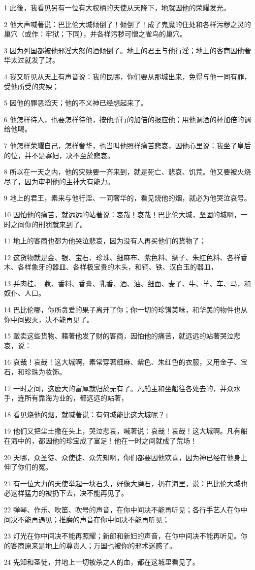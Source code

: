 \par 1 此後，我看见另有一位有大权柄的天使从天降下，地就因他的荣耀发光。
\par 2 他大声喊著说：巴比伦大城倾倒了！倾倒了！成了鬼魔的住处和各样污秽之灵的巢穴（或作：牢狱；下同），并各样污秽可憎之雀鸟的巢穴。
\par 3 因为列国都被他邪淫大怒的酒倾倒了。地上的君王与他行淫；地上的客商因他奢华太过就发了财。
\par 4 我又听见从天上有声音说：我的民哪，你们要从那城出来，免得与他一同有罪，受他所受的灾殃；
\par 5 因他的罪恶滔天；他的不义神已经想起来了。
\par 6 他怎样待人，也要怎样待他，按他所行的加倍的报应他；用他调酒的杯加倍的调给他喝。
\par 7 他怎样荣耀自己，怎样奢华，也当叫他照样痛苦悲哀，因他心里说：我坐了皇后的位，并不是寡妇，决不至於悲哀。
\par 8 所以在一天之内，他的灾殃要一齐来到，就是死亡、悲哀、饥荒。他又要被火烧尽了，因为审判他的主神大有能力。
\par 9 地上的君王，素来与他行淫、一同奢华的，看见烧他的烟，就必为他哭泣哀号。
\par 10 因怕他的痛苦，就远远的站著说：哀哉！哀哉！巴比伦大城，坚固的城啊，一时之间你的刑罚就来到了。
\par 11 地上的客商也都为他哭泣悲哀，因为没有人再买他们的货物了；
\par 12 这货物就是金、银、宝石、珍珠、细麻布、紫色料、绸子、朱红色料、各样香木、各样象牙的器皿、各样极宝贵的木头，和铜、铁、汉白玉的器皿，
\par 13 并肉桂、　蔻、香料、香膏、乳香、酒、油、细面、麦子、牛、羊、车、马，和奴仆、人口。
\par 14 巴比伦哪，你所贪爱的果子离开了你；你一切的珍馐美味，和华美的物件也从你中间毁灭，决不能再见了。
\par 15 贩卖这些货物、藉著他发了财的客商，因怕他的痛苦，就远远的站著哭泣悲哀，说：
\par 16 哀哉！哀哉！这大城啊，素常穿著细麻、紫色、朱红色的衣服，又用金子、宝石，和珍珠为妆饰。
\par 17 一时之间，这麽大的富厚就归於无有了。凡船主和坐船往各处去的，并众水手，连所有靠海为业的，都远远的站著，
\par 18 看见烧他的烟，就喊著说：有何城能比这大城呢？」
\par 19 他们又把尘土撒在头上，哭泣悲哀，喊著说：哀哉！哀哉！这大城啊。凡有船在海中的，都因他的珍宝成了富足！他在一时之间就成了荒场！
\par 20 天哪，众圣徒、众使徒、众先知啊，你们都要因他欢喜，因为神已经在他身上伸了你们的冤。
\par 21 有一位大力的天使举起一块石头，好像大磨石，扔在海里，说：巴比伦大城也必这样猛力的被扔下去，决不能再见了。
\par 22 弹琴、作乐、吹笛、吹号的声音，在你中间决不能再听见；各行手艺人在你中间决不能再遇见；推磨的声音在你中间决不能再听见；
\par 23 灯光在你中间决不能再照耀；新郎和新妇的声音，在你中间决不能再听见。你的客商原来是地上的尊贵人；万国也被你的邪术迷惑了。
\par 24 先知和圣徒，并地上一切被杀之人的血，都在这城里看见了。

